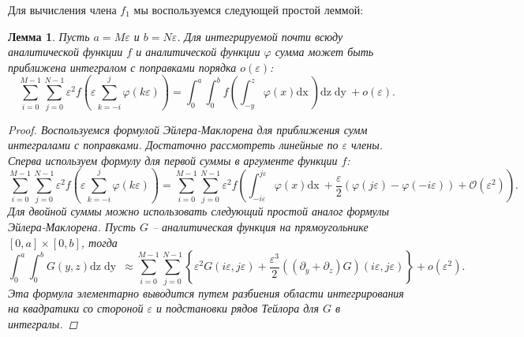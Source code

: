 \documentclass{article}
\newtheorem{lemma}{Лемма}
\newcommand{\dx}{\mathrm{dx}~}
\newcommand{\dy}{\mathrm{dy}~}
\newcommand{\dz}{\mathrm{dz}}
\begin{document}
Для вычисления члена $f_{1}$ мы воспользуемся следующей простой леммой:
\begin{lemma}
  Пусть  $a=M\varepsilon$ и $b=N\varepsilon$.
  Для интегрируемой почти всюду аналитической функции  $f$ и аналитической функции $\varphi$ сумма
  может быть приближена интегралом с поправками порядка $o(\varepsilon)$:
  \begin{equation}
    \label{eq:75}
    \sum_{i=0}^{M-1}\sum_{j=0}^{N-1}\varepsilon^{2}f\left(\varepsilon\sum_{k=-i}^{j}\varphi(k\varepsilon)\right)=
    \int_{0}^{a}\int_{0}^{b}f\left(\int_{-y}^{z}\varphi(x)\dx\right)\dz\;\dy+o(\varepsilon).
  \end{equation}
  \begin{proof}
    Воспользуемся формулой Эйлера-Маклорена для приближения сумм интегралами с поправками.
    Достаточно рассмотреть линейные по $\varepsilon$ члены. Сперва используем формулу для первой
    суммы в аргументе функции $f$:
  \begin{equation}
    \label{eq:76}
    \sum_{i=0}^{M-1}\sum_{j=0}^{N-1}\varepsilon^{2}f\left(\varepsilon\sum_{k=-i}^{j}\varphi(k\varepsilon)\right)=
    \sum_{i=0}^{M-1}\sum_{j=0}^{N-1}\varepsilon^{2}f\left(\int_{-i\varepsilon}^{j\varepsilon}\varphi(x)\dx+\frac{\varepsilon}{2}\left(\varphi(j\varepsilon)-\varphi(-i\varepsilon)\right)+\mathcal{O}(\varepsilon^{2})\right).
  \end{equation}
  Для двойной суммы можно использовать следующий простой аналог формулы Эйлера-Маклорена. Пусть $G$
  -- аналитическая функция на прямоугольнике  $[0,a]\times[0,b]$, тогда
\begin{equation}
  \label{eq:77}
  \int_{0}^{a} \int_{0}^{b}G(y,z) \dz\; \dy\;
  \approx\sum_{i=0}^{M-1}\sum_{j=0}^{N-1}\left\{\varepsilon^{2}G\left(i\varepsilon,j\varepsilon\right)+
    \frac{\varepsilon^{3}}{2}\left((\partial_{y}+\partial_{z})G\right)(i\varepsilon,j\varepsilon)\right\}+o(\varepsilon^{2}).
\end{equation}
Эта формула элементарно выводится путем разбиения области интегрирования на квадратики со стороной
$\varepsilon$ и подстановки рядов Тейлора для  $G$ в интегралы.


\end{proof}
\end{lemma}
\end{document}
